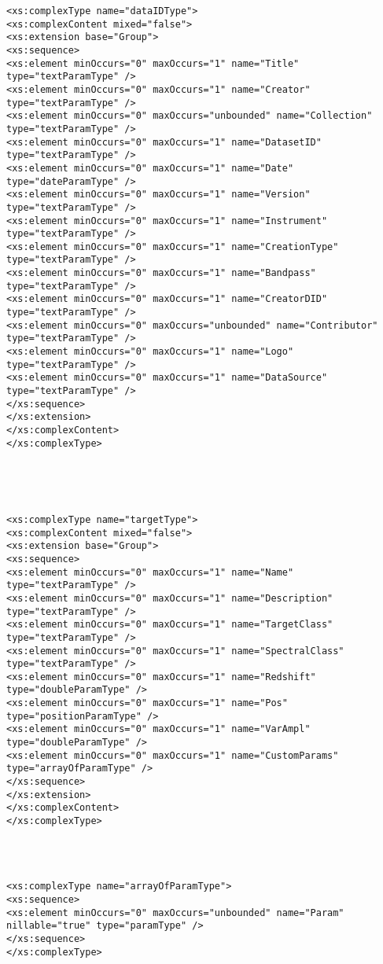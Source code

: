 {\begin{flushleft}
\begin{fmppage}
\begin{verbatim}
<xs:complexType name="dataIDType">
<xs:complexContent mixed="false">
<xs:extension base="Group">
<xs:sequence>
<xs:element minOccurs="0" maxOccurs="1" name="Title" type="textParamType" />
<xs:element minOccurs="0" maxOccurs="1" name="Creator" type="textParamType" />
<xs:element minOccurs="0" maxOccurs="unbounded" name="Collection" type="textParamType" />
<xs:element minOccurs="0" maxOccurs="1" name="DatasetID" type="textParamType" />
<xs:element minOccurs="0" maxOccurs="1" name="Date" type="dateParamType" />
<xs:element minOccurs="0" maxOccurs="1" name="Version" type="textParamType" />
<xs:element minOccurs="0" maxOccurs="1" name="Instrument" type="textParamType" />
<xs:element minOccurs="0" maxOccurs="1" name="CreationType" type="textParamType" />
<xs:element minOccurs="0" maxOccurs="1" name="Bandpass" type="textParamType" />
<xs:element minOccurs="0" maxOccurs="1" name="CreatorDID" type="textParamType" />
<xs:element minOccurs="0" maxOccurs="unbounded" name="Contributor" type="textParamType" />
<xs:element minOccurs="0" maxOccurs="1" name="Logo" type="textParamType" />
<xs:element minOccurs="0" maxOccurs="1" name="DataSource" type="textParamType" />
</xs:sequence>
</xs:extension>
</xs:complexContent>
</xs:complexType>




\end{verbatim}
\end{fmppage}

\begin{fmppage}
\begin{verbatim}

<xs:complexType name="targetType">
<xs:complexContent mixed="false">
<xs:extension base="Group">
<xs:sequence>
<xs:element minOccurs="0" maxOccurs="1" name="Name" type="textParamType" />
<xs:element minOccurs="0" maxOccurs="1" name="Description" type="textParamType" />
<xs:element minOccurs="0" maxOccurs="1" name="TargetClass" type="textParamType" />
<xs:element minOccurs="0" maxOccurs="1" name="SpectralClass" type="textParamType" />
<xs:element minOccurs="0" maxOccurs="1" name="Redshift" type="doubleParamType" />
<xs:element minOccurs="0" maxOccurs="1" name="Pos" type="positionParamType" />
<xs:element minOccurs="0" maxOccurs="1" name="VarAmpl" type="doubleParamType" />
<xs:element minOccurs="0" maxOccurs="1" name="CustomParams" type="arrayOfParamType" />
</xs:sequence>
</xs:extension>
</xs:complexContent>
</xs:complexType>




<xs:complexType name="arrayOfParamType">
<xs:sequence>
<xs:element minOccurs="0" maxOccurs="unbounded" name="Param" nillable="true" type="paramType" />
</xs:sequence>
</xs:complexType>



\end{verbatim}
\end{fmppage}
\end{flushleft}}
